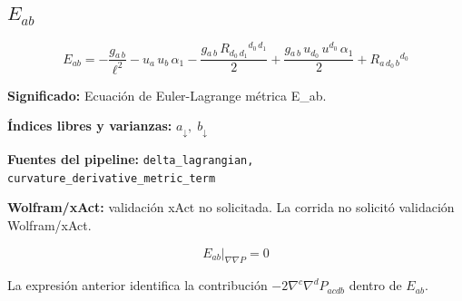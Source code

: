 \documentclass[11pt]{article}
\begin{document}
\subsection*{$ E_{ab} $}
\begin{dmath*}[breakdepth={5}]
E_{ab} = -\frac{g{}_{a\,b}}{{\ell}^{2}} - u{}_{a}\,u{}_{b}\,\alpha_{1} - \frac{g{}_{a\,b}\,R{}_{d_{0}\,d_{1}}{}^{d_{0}\,d_{1}}}{2} + \frac{g{}_{a\,b}\,u{}_{d_{0}}\,u{}^{d_{0}}\,\alpha_{1}}{2} + R{}_{a\,d_{0}\,b}{}^{d_{0}}
\end{dmath*}
\par\vspace{1.2\baselineskip}\noindent
\begin{minipage}{\linewidth}
\textbf{Significado:} Ecuación de Euler-Lagrange métrica E\_ab.\par
\textbf{Índices libres y varianzas:} $ a_{\downarrow},\;b_{\downarrow} $\par
\textbf{Fuentes del pipeline:} \texttt{delta\_lagrangian, curvature\_derivative\_metric\_term}\par
\textbf{Wolfram/xAct:} validación xAct no solicitada. La corrida no solicitó validación Wolfram/xAct.\par
\end{minipage}
\begin{dmath*}[breakdepth={5}]
\left.E_{ab}\right|_{\nabla\nabla P} = 0
\end{dmath*}
\par\vspace{0.8\baselineskip}\noindent
\begin{minipage}{\linewidth}
La expresión anterior identifica la contribución $-2\nabla^c\nabla^dP_{acdb}$ dentro de $E_{ab}$.\par
\end{minipage}
\end{document}
